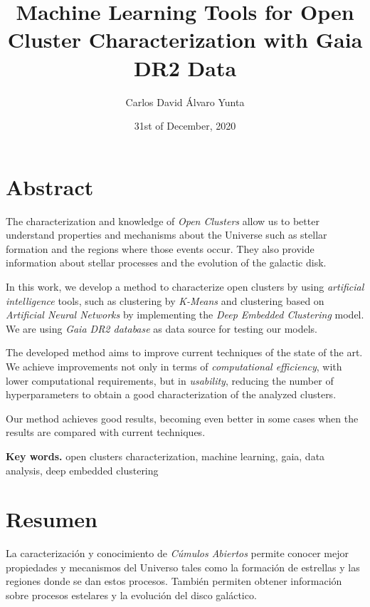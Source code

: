 \documentclass[11pt, a4paper, english]{book}
\title{Machine Learning Tools for Open Cluster Characterization with Gaia DR2 Data}
\author{Carlos David Álvaro Yunta}
\date{31st of December, 2020}
\begin{document}

\maketitle

\frontmatter
\tableofcontents

\chapter{Abstract}

The characterization and knowledge of \emph{Open Clusters} allow us to better understand properties and mechanisms about the Universe
such as stellar formation and the regions where those events occur.
They also provide information about stellar processes and the evolution of the galactic disk.

In this work, we develop a method to characterize open clusters by using \emph{artificial intelligence} tools,
such as clustering by \emph{K-Means} and clustering based on \emph{Artificial Neural Networks} by implementing the \emph{Deep Embedded Clustering} model.
We are using \emph{Gaia DR2 database} as data source for testing our models.

The developed method aims to improve current techniques of the state of the art.
We achieve improvements not only in terms of \emph{computational efficiency}, with lower computational requirements, but in \emph{usability},
reducing the number of hyperparameters to obtain a good characterization of the analyzed clusters.

Our method achieves good results, becoming even better in some cases when the results are compared with current techniques.

\medskip

{\bf Key words.} open clusters characterization, machine learning, gaia, data analysis, deep embedded clustering

\chapter{Resumen}

La caracterización y conocimiento de \emph{Cúmulos Abiertos} permite conocer mejor propiedades y mecanismos del Universo tales como
la formación de estrellas y las regiones donde se dan estos procesos. También permiten obtener información sobre procesos estelares
y la evolución del disco galáctico.
\end{document}
